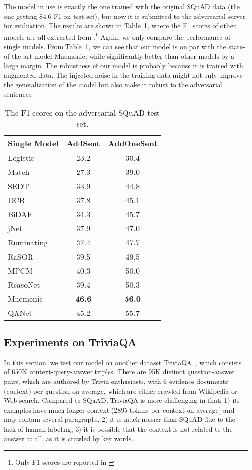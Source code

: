 \documentclass{article} \usepackage{iclr2018_conference,times}
\begin{document}
The model in use is exactly the one trained with the original SQuAD data (the one getting 84.6 F1 on test set), but now it is submitted to the adversarial server for evaluation. 
The results are shown in Table~\ref{table:squad_adversarial}, where the F1 scores of other models are all extracted from \cite{JiaL17}.\footnote{Only F1 scores are reported in \cite{JiaL17}} Again, we only compare the performance of single models. From Table~\ref{table:squad_adversarial}, we can see that our model is on par with the state-of-the-art model Mnemonic, while significantly better than other models by a large margin. The robustness of our model is probably because it is trained with augmented data. The injected noise in the training data might not only improve the generalization of the model but also make it robust to the adversarial sentences.  

\begin{table}[ht]
\small
\begin{center}
\begin{tabular}{lcc}
\hline Single Model & AddSent  & AddOneSent \\\hline
Logistic~\citep{RajpurkarZLL16} & 23.2 & 30.4\\
Match~\citep{WangJ16a} & 27.3 & 39.0\\
SEDT~\citep{LiuHWYN17} & 33.9 & 44.8\\
DCR~\citep{YuZHYXZ16} & 37.8 & 45.1 \\
BiDAF~\citep{SeoKFH16} & 34.3 & 45.7\\
jNet~\citep{ZhangZCDWJ17} & 37.9 & 47.0 \\
Ruminating~\citep{GongB17} & 37.4 & 47.7 \\
RaSOR~\citep{LeeKP016} & 39.5 & 49.5\\
MPCM~\citep{WangMHF16}  & 40.3 & 50.0\\
ReasoNet~\citep{ShenHGC17} & 39.4 & 50.3\\
Mnemonic~\citep{HuPQ17} & \textbf{46.6} & \textbf{56.0}\\
\hline
QANet & 45.2 &  55.7 \\
\hline \end{tabular}
\end{center}
\caption{The F1 scores on the adversarial SQuAD test set. 
}
\label{table:squad_adversarial}
\end{table}


\subsection{Experiments on TriviaQA}
In this section, we test our model on another dataset TriviaQA~\citep{JoshiCWZ17},
which consists of 650K context-query-answer
triples. There are 95K distinct question-answer pairs, which are authored by 
Trivia enthusiasts, with 6 evidence documents (context)
per question on average, which are either crawled from Wikipedia or Web search.
Compared to SQuAD, TriviaQA is more challenging in that: 1) its examples have much longer context (2895 tokens per context on average) and may contain several paragraphs, 2) it is much noisier than SQuAD due to the lack of human labeling, 3) it is possible that the context is not related to the answer at all, as it is crawled by key words. 
\end{document}
